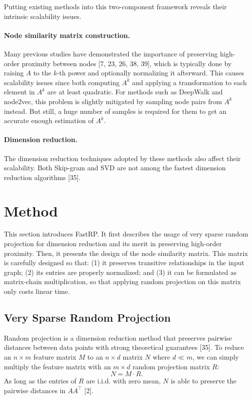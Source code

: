 \documentclass[11pt]{article}
\begin{document}
Putting existing methods into this two-component framework reveals their intrinsic scalability issues.

\paragraph{Node similarity matrix construction.}
Many previous studies have demonstrated the importance of preserving high-order proximity between nodes [7, 23, 26, 38, 39], which is typically done by raising $A$ to the $k$-th power and optionally normalizing it afterward. This causes scalability issues since both computing $A^k$ and applying a transformation to each element in $A^k$ are at least quadratic. For methods such as DeepWalk and node2vec, this problem is slightly mitigated by sampling node pairs from $A^k$ instead. But still, a huge number of samples is required for them to get an accurate enough estimation of $A^k$.

\paragraph{Dimension reduction.}
The dimension reduction techniques adopted by these methods also affect their scalability. Both Skip-gram and SVD are not among the fastest dimension reduction algorithms [35].

\section{Method}

This section introduces FastRP. It first describes the usage of very sparse random projection for dimension reduction and its merit in preserving high-order proximity. Then, it presents the design of the node similarity matrix. This matrix is carefully designed so that: (1) it preserves transitive relationships in the input graph; (2) its entries are properly normalized; and (3) it can be formulated as matrix-chain multiplication, so that applying random projection on this matrix only costs linear time.

\subsection{Very Sparse Random Projection}

Random projection is a dimension reduction method that preserves pairwise distances between data points with strong theoretical guarantees [35]. To reduce an $n \times m$ feature matrix $M$ to an $n \times d$ matrix $N$ where $d \ll m$, we can simply multiply the feature matrix with an $m \times d$ random projection matrix $R$:
\begin{equation}
N = M \cdot R.
\end{equation}
As long as the entries of $R$ are i.i.d. with zero mean, $N$ is able to preserve the pairwise distances in $AA^\top$ [2].
\end{document}
